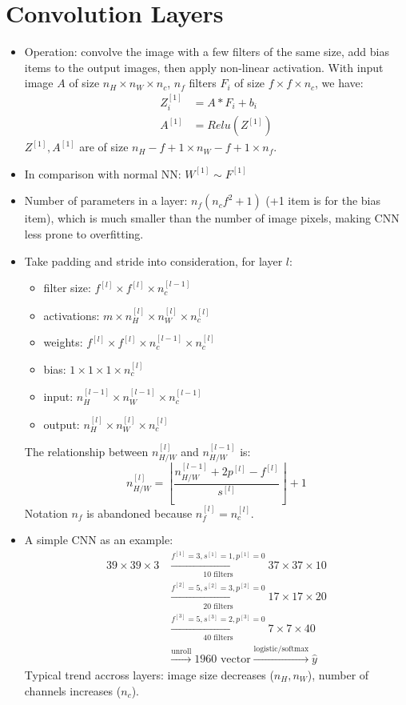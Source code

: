 \section{Convolution Layers}
\begin{itemize}
  \item Operation: convolve the image with a few filters of the same size, add bias items to the output images, then apply non-linear activation. With input image $A$ of size $n_H\times n_W\times n_c$, $n_f$ filters $F_i$ of size $f\times f\times n_c$, we have:
  \begin{align*}
    Z^{[1]}_i&=A*F_i + b_i\\
    A^{[1]}&=Relu\left(Z^{[1]}\right)
  \end{align*}
  $Z^{[1]}, A^{[1]}$ are of size $n_H-f+1\times n_W-f+1\times n_f$.
  \item In comparison with normal NN: $W^{[1]}\sim F^{[1]}$
  \item Number of parameters in a layer: $n_f\left(n_cf^2 + 1\right)$ (+1 item is for the bias item), which is much smaller than the number of image pixels, making CNN less prone to overfitting.
  \item Take padding and stride into consideration, for layer $l$: 
  \begin{itemize}
      \item filter size: $f^{[l]}\times f^{[l]}\times n_c^{[l-1]}$
      \item activations: $m\times n_H^{[l]}\times n_W^{[l]}\times n_c^{[l]}$
      \item weights: $f^{[l]}\times f^{[l]}\times n_c^{[l-1]}\times n_c^{[l]}$
      \item bias: $1\times 1\times 1\times n_c^{[l]}$
      \item input: $n_H^{[l-1]}\times n_W^{[l-1]}\times n_c^{[l-1]}$
      \item output: $n_H^{[l]}\times n_W^{[l]}\times n_c^{[l]}$
  \end{itemize}
  The relationship between $n^{[l]}_{H/W}$ and $n^{[l-1]}_{H/W}$ is:
  \[n^{[l]}_{H/W}=\left\lfloor\frac{n^{[l-1]}_{H/W}+2p^{[l]}-f^{[l]}}{s^{[l]}}\right\rfloor+1\]
  Notation $n_f$ is abandoned because $n_f^{[l]}=n_c^{[l]}$.
  \item A simple CNN as an example:
  \begin{align*}
    39\times 39\times 3&\xrightarrow[10\text{ filters}]{f^{[1]}=3,s^{[1]}=1,p^{[1]}=0}37\times 37\times 10\\
    &\xrightarrow[20\text{ filters}]{f^{[2]}=5,s^{[2]}=3,p^{[2]}=0}17\times 17\times 20\\
    &\xrightarrow[40\text{ filters}]{f^{[3]}=5,s^{[3]}=2,p^{[3]}=0}7\times 7\times 40\\
    &\xrightarrow{\text{unroll}}1960\text{ vector}\xrightarrow{\text{logistic/softmax}}\hat{y}
  \end{align*}
  Typical trend accross layers: image size decreases ($n_H, n_W$), number of channels increases ($n_c$).
\end{itemize}
